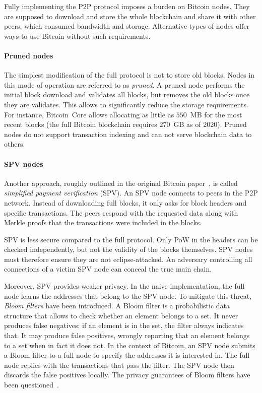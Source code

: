 Fully implementing the P2P protocol imposes a burden on Bitcoin nodes.
They are supposed to download and store the whole blockchain and share it with other peers, which consumed bandwidth and storage.
Alternative types of nodes offer ways to use Bitcoin without such requirements.

\paragraph{Pruned nodes}
The simplest modification of the full protocol is not to store old blocks.
Nodes in this mode of operation are referred to as \textit{pruned}.
A pruned node performs the initial block download and validates all blocks, but removes the old blocks once they are validates.
This allows to significantly reduce the storage requirements.
For instance, Bitcoin~Core allows allocating as little as $550$~MB for the most recent blocks (the full Bitcoin blockchain requires $270$~GB as of 2020).
Pruned nodes do not support transaction indexing and can not serve blockchain data to others.

\paragraph{SPV nodes}
Another approach, roughly outlined in the original Bitcoin paper~\cite{Nakamoto2008}, is called \textit{simplified payment verification} (SPV).
An SPV node connects to peers in the P2P network.
Instead of downloading full blocks, it only asks for block headers and specific transactions.
The peers respond with the requested data along with Merkle proofs that the transactions were included in the blocks.

SPV is less secure compared to the full protocol.
Only PoW in the headers can be checked independently, but not the validity of the blocks themselves.
SPV nodes must therefore ensure they are not eclipse-attacked.
An adversary controlling all connections of a victim SPV node can conceal the true main chain.

Moreover, SPV provides weaker privacy.
In the naive implementation, the full node learns the addresses that belong to the SPV node.
To mitigate this threat, \textit{Bloom filters} have been introduced.
A Bloom filter is a probabilistic data structure that allows to check whether an element belongs to a set.
It never produces false negatives: if an element is in the set, the filter always indicates that.
It may produce false positives, wrongly reporting that an element belongs to a set when in fact it does not.
In the context of Bitcoin, an SPV node submits a Bloom filter to a full node to specify the addresses it is interested in.
The full node replies with the transactions that pass the filter.
The SPV node then discards the false positives locally.
The privacy guarantees of Bloom filters have been questioned~\cite{Gervais2014}.

